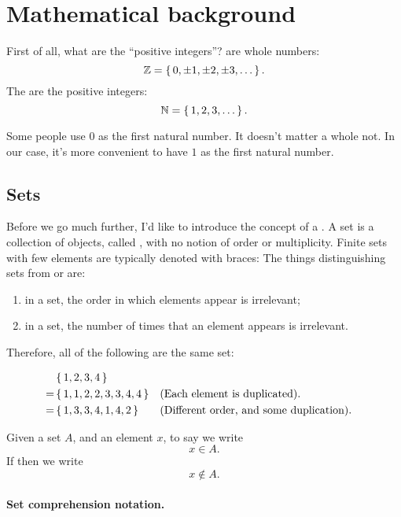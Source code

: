 \section{Mathematical background}

First of all, what are the ``positive integers''?  are
whole numbers: $$\mathbb{Z} = \left\{\, 0, \pm 1, \pm 2, \pm 3, \dots \,\right\}.$$ The
 are the positive integers:
$$\mathbb{N} = \left\{\, 1,2,3,\dots \,\right\}.$$

\begin{remark}
  Some people use $0$ as the first natural number. It doesn't matter a
  whole not. In our case, it's more convenient to have $1$ as the
  first natural number.
\end{remark}

\subsection{Sets}

Before we go much further, I'd like to introduce the concept of a
. A set is a collection of objects, called ,
with no notion of order or multiplicity. Finite sets with few elements
are typically denoted with braces: 
The things distinguishing sets from  or 
are:

\begin{enumerate}
\item in a set, the order in which elements appear is irrelevant;
\item in a set, the number of times that an element appears is
  irrelevant.
\end{enumerate}

Therefore, all of the following are the same set:

\begin{align*}
  & \left\{\, 1,2,3,4 \,\right\} \\
  = & \left\{\, 1,1,2,2,3,3,4,4 \,\right\} && \text{(Each element is duplicated).} \\
  = & \left\{\, 1, 3, 3, 4, 1, 4, 2 \,\right\} && \text{(Different order, and some duplication).}
\end{align*}

Given a set $A$, and an element $x$, to say  we write $$x \in A.$$ If  then we write $$x \notin A.$$

\paragraph{Set comprehension notation.}

